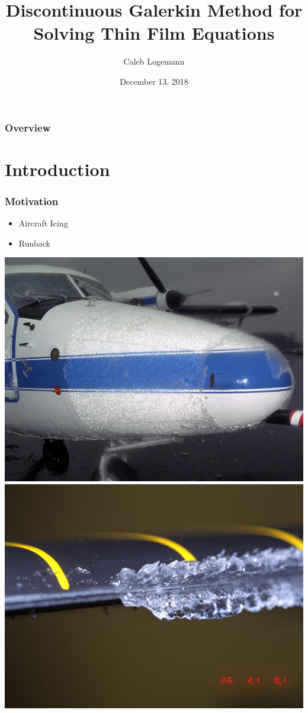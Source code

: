 \documentclass[10pt]{beamer}
\title[]{Discontinuous Galerkin Method for Solving Thin Film Equations} %
\author{Caleb Logemann} %
\institute[Iowa State University]{%
Mathematics Department, Iowa State University \\ %
\medskip
\textit{logemann@iastate.edu}} %
\date{December 13, 2018} %
\begin{document}
  \begin{frame}
    \titlepage{}
  \end{frame}

  \begin{frame}
    \frametitle{Overview}
    \tableofcontents
  \end{frame}

  \section{Introduction}
    \begin{frame}
      \frametitle{Motivation}
      \begin{itemize}
        \item Aircraft Icing
        \item Runback
      \end{itemize}
      \begin{center}
        \includegraphics[scale=0.2]{Figures/Icing_on_a_plane.jpg}
        \hspace{0.1in}
        \includegraphics[scale=0.2]{Figures/Icing_on_a_rotor.jpg}

\end{center}
\end{frame}
\end{document}
